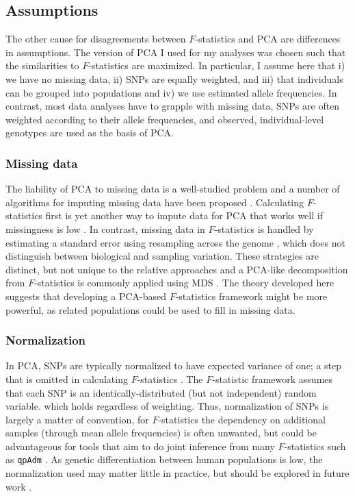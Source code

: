 \documentclass[12pt,fullpage, a4paper]{article}
\begin{document}
\subsection{Assumptions}
The other cause for disagreements between $F$-statistics and PCA are differences in assumptions. The version of PCA I used for my analyses was chosen such that the similarities to $F$-statistics are maximized. In particular, I assume here that i) we have no missing data, ii) SNPs are equally weighted, and iii) that individuals can be grouped into populations and iv) we use estimated allele frequencies. In contrast, most data analyses have to grapple with missing data, SNPs are often weighted according to their allele frequencies, and observed, individual-level genotypes are used as the basis of PCA.

\subsubsection{Missing data}
The liability of PCA to missing data is a well-studied problem and a number of algorithms for imputing missing data have been proposed \citep[e.g.][]{hastie2015, meisner2018, meisner2021}. Calculating $F$-statistics first is yet another way to impute data for PCA that works well if missingness is low \citep{meisner2021}. In contrast, missing data in $F$-statistics is handled by estimating a standard error using resampling across the genome \citep{patterson2012}, which does not distinguish between biological and sampling variation. These strategies are distinct, but not unique to the relative approaches and a PCA-like decomposition from $F$-statistics is commonly applied using MDS \citep[e.g.][]{fu2016}. The theory developed here suggests that developing a PCA-based $F$-statistics framework might be more powerful, as related populations could be used to fill in missing data.

\subsubsection{Normalization}
In PCA, SNPs are typically normalized to have expected variance of one; a step that is omitted in calculating $F$-statistics \citep{patterson2006}. The $F$-statistic framework assumes that each SNP is an identically-distributed (but not independent) random variable. which holds regardless of weighting. Thus, normalization of SNPs is largely a matter of convention, for  $F$-statistics the dependency on  additional samples (through  mean allele frequencies) is often unwanted, but could be advantageous for tools that aim to do joint inference from  many $F$-statistics such as \texttt{qpAdm} \citep{patterson2012, harney2021}. As genetic differentiation between human populations is low, the  normalization used may matter little in practice, but should be explored in future work \citep{felsenstein1973}. 
\end{document}
